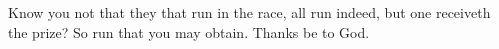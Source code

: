 Know you not that they that run in the race, all run indeed, but one receiveth the prize? So run that you may obtain. \rubric{\Rbar} Thanks be to God.